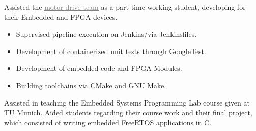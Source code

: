 \documentclass[10pt,a4paper,ragged2e,withhyper]{altacv}
\begin{document}
\begin{paracol}{2}
\divider

Assisted the \href{https://molabo.com/unternehmen/}{{\textcolor{gray}{\underline{motor-drive team}}}}
as a part-time working student, developing for their Embedded and FPGA devices.

\begin{itemize}
\item Supervised pipeline execution on Jenkins/via Jenkinsfiles.
\item Development of containerized unit tests through GoogleTest.
\item Development of embedded code and FPGA Modules.
\item Building toolchains via CMake and GNU Make.
\end{itemize}

\divider

Assisted in teaching the Embedded Systems Programming Lab course given at TU Munich.
Aided students regarding their course work and their final project, which 
consisted of writing embedded FreeRTOS applications in C.

\medskip

\nocite{*}

\switchcolumn


 \\
\\
\\
\\
\\
\\
\\
\\


\\


\end{paracol}
\end{document}
